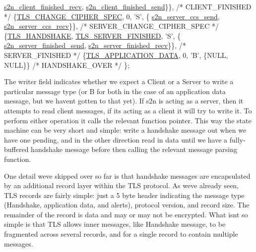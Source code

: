 \begin{DoxyCode}
      \hyperlink{s2n__client__finished_8c_a1e5af2e3c7ad308eb7a32333210875f5}{s2n\_client\_finished\_recv}, \hyperlink{s2n__client__finished_8c_ac384b39fb82314ba9d3d4aebbae8f0e3}{s2n\_client\_finished\_send}\}\}, \textcolor{comment}{/*
       CLIENT\_FINISHED           */}
    \{\hyperlink{s2n__tls__parameters_8h_a5788d973268381c45d0909ebc14a16fd}{TLS\_CHANGE\_CIPHER\_SPEC}, 0,            \textcolor{charliteral}{'S'}, \{
      \hyperlink{s2n__server__ccs_8c_ad4c716e8d39e6bb93acba86ccda02554}{s2n\_server\_ccs\_send},      \hyperlink{s2n__server__ccs_8c_ae06266c2514a2576c570f3f01d9f9ecf}{s2n\_server\_ccs\_recv}\}\},      \textcolor{comment}{/*
       SERVER\_CHANGE\_CIPHER\_SPEC */}
    \{\hyperlink{s2n__fragmentation__coalescing__test_8c_a04fd920fd9f28238887e4c6417b4d4cc}{TLS\_HANDSHAKE}, \hyperlink{s2n__handshake__io_8c_a5bd625f2fac81aaad1575a65bffbfa71}{TLS\_SERVER\_FINISHED},   \textcolor{charliteral}{'S'}, \{
      \hyperlink{s2n__server__finished_8c_a1faebdea4c42a7b27ce347885b9bd9ee}{s2n\_server\_finished\_send}, \hyperlink{s2n__server__finished_8c_adae4d52456ffeb3a606ed1fb545539e4}{s2n\_server\_finished\_recv}\}\}, \textcolor{comment}{/*
       SERVER\_FINISHED           */}
    \{\hyperlink{s2n__tls__parameters_8h_a5104f80ba38ebfd2266b1ec313f0aeb2}{TLS\_APPLICATION\_DATA}, 0,              \textcolor{charliteral}{'B'}, \{NULL, NULL\}\}    \textcolor{comment}{/* HANDSHAKE\_OVER     
             */}
\};
\end{DoxyCode}


The \textquotesingle{}writer\textquotesingle{} field indicates whether we expect a Client or a Server to write a particular message type (or \textquotesingle{}B\textquotesingle{} for both in the case of an application data message, but we haven\textquotesingle{}t gotten to that yet). If s2n is acting as a server, then it attempts to read client messages, if it\textquotesingle{}s acting as a client it will try to write it. To perform either operation it calls the relevant function pointer. This way the state machine can be very short and simple\+: write a handshake message out when we have one pending, and in the other direction read in data until we have a fully-\/buffered handshake message before then calling the relevant message parsing function.

One detail we\textquotesingle{}ve skipped over so far is that handshake messages are encapsulated by an additional record layer within the T\+LS protocol. As we\textquotesingle{}ve already seen, T\+LS records are fairly simple\+: just a 5 byte header indicating the message type (Handshake, application data, and alerts), protocol version, and record size. The remainder of the record is data and may or may not be encrypted. What isn\textquotesingle{}t so simple is that T\+LS allows \textquotesingle{}inner\textquotesingle{} messages, like Handshake message, to be fragmented across several records, and for a single record to contain multiple messages.



